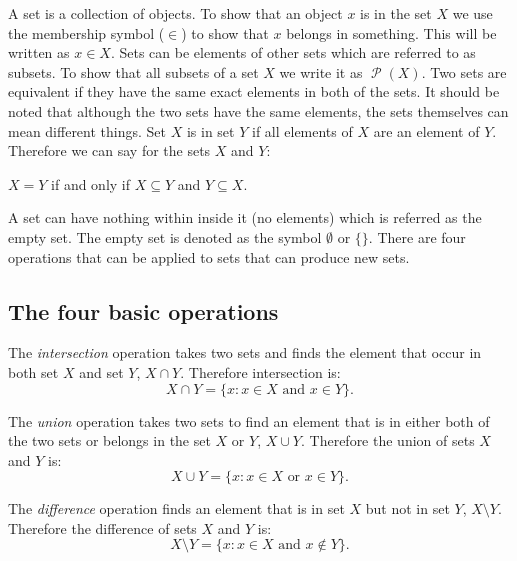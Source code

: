 \documentclass[11pt,a4paper]{report}
\DeclareMathOperator{\power}{\mathcal{P}}
\begin{document}
A set is a collection of objects. To show that an object $x$ is in the set $X$ we use the membership symbol ($\in$) to show that $x$ belongs in something. This will be written as $x \in X$. Sets can be elements of other sets which are referred to as subsets. To show that all subsets of a set $X$ we write it as $\power(X)$. Two sets are equivalent if they have the same exact elements in both of the sets. It should be noted that although the two sets have the same elements, the sets themselves can mean different things. Set $X$ is in set $Y$ if all elements of $X$ are an element of $Y$.
Therefore we can say for the sets $X$ and $Y$:
\begin{center}
  $X=Y$ if and only if $X \subseteq Y$ and $Y \subseteq X$.
\end{center}
A set can have nothing within inside it (no elements) which is referred as the empty set. The empty set is denoted as the symbol $\emptyset$ or $\{\}$. There are four operations that can be applied to sets that can produce new sets.  

\subsection{The four basic operations}
\label{sec:fourbasop}

The \emph{intersection} operation takes two sets and finds the element that occur in both set $X$ and set $Y$, $X \cap Y$. Therefore intersection is:
\begin{displaymath}
  X \cap Y = \{x : x \in X  \text{ and } x \in Y\}.
\end{displaymath}

The \emph{union} operation takes two sets to find an element that is in either both of the two sets or belongs in the set $X$ or $Y$, $X \cup Y$. Therefore the union of sets $X$ and $Y$ is:
\begin{displaymath}
  X \cup Y = \{x : x \in X  \text{ or } x \in Y\}.
\end{displaymath}

The \emph{difference} operation finds an element that is in set $X$ but not in set $Y$, $X \setminus Y$. Therefore the difference of sets $X$ and $Y$ is:
\begin{displaymath}
  X \setminus Y = \{x : x \in X  \text{ and } x \notin Y\}.
\end{displaymath}
\end{document}
